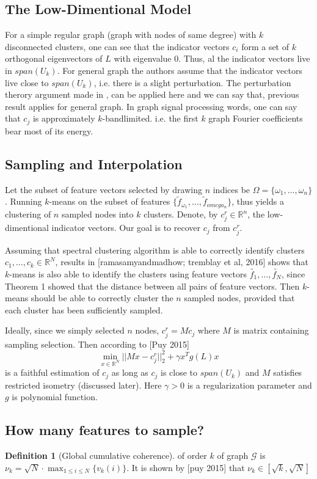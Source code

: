 \documentclass[10pt,a4paper,twoside]{report}
\theoremstyle{definition}
\newtheorem{definition}{Definition}[section]
\newcommand{\norm}[1]{\lvert\lvert {#1} \rvert\rvert}
\begin{document}
	\subsection{The Low-Dimentional Model}
	For a simple regular graph (graph with nodes of same degree) with $k$ disconnected clusters, one can see that the indicator vectors ${c_i}$ form a set of $k$ orthogonal eigenvectors of $L$ with eigenvalue 0. Thus, al the indicator vectors live in $span(U_k)$. For general graph the authors assume that the indicator vectors live close to $span(U_k)$, i.e. there is a slight perturbation. The perturbation therory argument made in \cite{Luxburg2007}, can be applied here and we can say that, previous result applies for general graph. In graph signal processing words, one can say that $c_j$ is approximately $k$-bandlimited. i.e. the first $k$ graph Fourier coefficients bear most of its energy. 
	\subsection{Sampling and Interpolation}
	Let the subset of feature vectors selected by drawing $n$ indices be $\Omega = \{\omega_1,\dots,\omega_n\}$. Running $k$-means on the subset of features $\{\tilde{f}_{\omega_1},\dots,\tilde{f}_{omega_n}\}$, thus yields a clustering of $n$ sampled nodes into $k$ clusters. Denote, by $c_j^r \in \mathbb{R}^n$, the low-dimentional indicator vectors. Our goal is to recover $c_j$ from $c_j^r$. 

	Assuming that spectral clustering algorithm is able to correctly identify clusters $c_1,\dots,c_k \in \mathbb{R}^N$, results in [ramasamyandmadhow; tremblay et al, 2016] shows that $k$-means is also able to identify the clusters using feature vectors $\tilde{f_1},\dots,\tilde{f_N}$, since Theorem 1 showed that the distance between all pairs of feature vectors. Then $k$-means should be able to correctly cluster the $n$ sampled nodes, provided that each cluster has been sufficiently sampled. 

	Ideally, since we simply selected $n$ nodes, $c_j^r = Mc_j$ where $M$ is matrix containing sampling selection. Then according to [Puy 2015] $$ \min_{x\in \mathbb{R}^N}\norm{Mx-c_j^r}_2^2 + \gamma x^Tg(L)x$$ is a faithful estimation of $c_j$ as long as $c_j$ is close to $span(U_k)$ and $M$ satisfies restricted isometry (discussed later). Here $\gamma > 0$ is a regularization parameter and $g$ is polynomial function.

	\subsection{How many features to sample?}
	\begin{definition}[Global cumulative coherence] of order $k$ of graph $\mathcal{G}$ is $\nu_k = \sqrt{N}\cdot \max_{1\le i \le N}\{v_k(i)\}$. It is shown by [puy 2015] that $\nu_k \in [\sqrt{k}, \sqrt{N}]$\end{definition}
\end{document}
